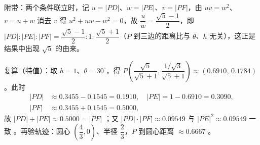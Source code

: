 \begin{answer}
附带：两个条件联立时，记 $u=|PD|$、$w=|PE|$、$v=|PF|$，由 $uv=w^2$、$v=u+w$ 消去 $v$ 得 $u^2+uw-w^2=0$，故 $\dfrac uw=\dfrac{\sqrt5-1}2$，即 $|PD|:|PE|:|PF|=\dfrac{\sqrt5-1}2:1:\dfrac{\sqrt5+1}2$（$P$ 到三边的距离比与 $\theta$、$h$ 无关），这正是结果中出现 $\sqrt5$ 的由来。

复算（特值）：取 $h=1$、$\theta=30^\circ$，得 $P\left(\dfrac{\sqrt5}{\sqrt5+1},\dfrac{1/\sqrt3}{\sqrt5+1}\right)\approx(0.6910,\,0.1784)$。此时
\nopagebreak[4]
\[
\begin{aligned}
|PD|&\approx0.3455-0.1545=0.1910,\quad |PE|=1-0.6910=0.3090,\\
|PF|&\approx0.3455+0.1545=0.5000,
\end{aligned}
\]
故 $|PD|+|PE|\approx0.5000=|PF|$ ；又 $|PD|\cdot|PF|\approx0.09549$ 与 $|PE|^2\approx0.09549$ 一致 。再验轨迹：圆心 $\left(\dfrac43,0\right)$、半径 $\dfrac23$，$P$ 到圆心距离 $\approx0.6667$ 。



\end{answer}